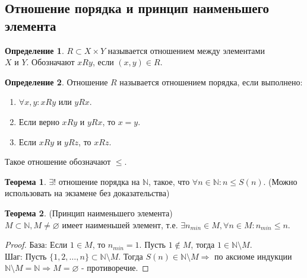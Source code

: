 \documentclass[a4paper, 12pt]{article}
\newcommand{\N}{\mathbb{N}}
\renewcommand{\emptyset}{\varnothing}
\theoremstyle{definition}
\newtheorem*{definition}{Определение}
\newtheorem*{theorem}{Теорема}
\begin{document}
    \subsection{Отношение порядка и принцип наименьшего элемента}
        \begin{definition}
            $R\subset X\times Y$ называется отношением между элементами\\ $X$ и $Y$. Обозначают $xRy$, если $(x,y)\in R$.
        \end{definition}
        \begin{definition}
            Отношение $R$ называется отношением порядка, если выполнено:
            \begin{enumerate}
                \item $\forall x,y: xRy$ или $yRx$. 
                \item Если верно $xRy$ и $yRx$, то $x=y$. 
                \item Если $xRy$ и $yRz$, то $xRz$.
            \end{enumerate}
            Такое отношение обозначают $\leq$.
        \end{definition}
        \begin{theorem}
            $\exists !$ отношение порядка на $\N$, такое, что $\forall n\in \N: n\leq S(n)$. (Можно использовать на экзамене без доказательства)
        \end{theorem}
        \begin{theorem} (Принцип наименьшего элемента)\\
            $M\subset \N, M\ne \emptyset$ имеет наименьшей элемент, т.е. $\exists n_{min}\in M, \forall n\in M: n_{min}\leq n$.
        \end{theorem} 
        \begin{proof}
            База: Если $1\in M$, то $n_{min}=1$. Пусть $1\notin M$, тогда $1\in \N\setminus M$.\\
            Шаг: Пусть $\{1,2,\dots, n\}\subset \N\setminus M$. Тогда $S(n)\in \N\setminus M\Rightarrow$ по аксиоме индукции $\N\setminus M=\N\Rightarrow M = \emptyset$ - противоречие.
        \end{proof}
\end{document}
